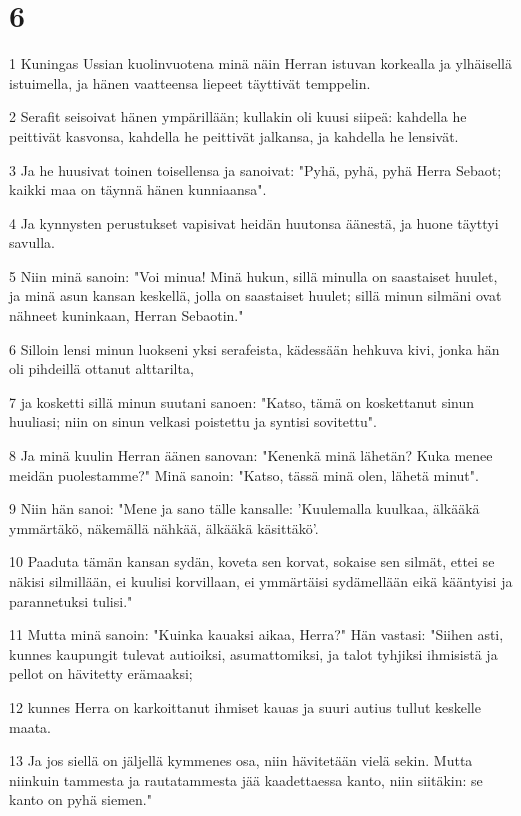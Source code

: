 \chapter{6}

\par 1 Kuningas Ussian kuolinvuotena minä näin Herran istuvan korkealla ja ylhäisellä istuimella, ja hänen vaatteensa liepeet täyttivät temppelin.
\par 2 Serafit seisoivat hänen ympärillään; kullakin oli kuusi siipeä: kahdella he peittivät kasvonsa, kahdella he peittivät jalkansa, ja kahdella he lensivät.
\par 3 Ja he huusivat toinen toisellensa ja sanoivat: "Pyhä, pyhä, pyhä Herra Sebaot; kaikki maa on täynnä hänen kunniaansa".
\par 4 Ja kynnysten perustukset vapisivat heidän huutonsa äänestä, ja huone täyttyi savulla.
\par 5 Niin minä sanoin: "Voi minua! Minä hukun, sillä minulla on saastaiset huulet, ja minä asun kansan keskellä, jolla on saastaiset huulet; sillä minun silmäni ovat nähneet kuninkaan, Herran Sebaotin."
\par 6 Silloin lensi minun luokseni yksi serafeista, kädessään hehkuva kivi, jonka hän oli pihdeillä ottanut alttarilta,
\par 7 ja kosketti sillä minun suutani sanoen: "Katso, tämä on koskettanut sinun huuliasi; niin on sinun velkasi poistettu ja syntisi sovitettu".
\par 8 Ja minä kuulin Herran äänen sanovan: "Kenenkä minä lähetän? Kuka menee meidän puolestamme?" Minä sanoin: "Katso, tässä minä olen, lähetä minut".
\par 9 Niin hän sanoi: "Mene ja sano tälle kansalle: 'Kuulemalla kuulkaa, älkääkä ymmärtäkö, näkemällä nähkää, älkääkä käsittäkö'.
\par 10 Paaduta tämän kansan sydän, koveta sen korvat, sokaise sen silmät, ettei se näkisi silmillään, ei kuulisi korvillaan, ei ymmärtäisi sydämellään eikä kääntyisi ja parannetuksi tulisi."
\par 11 Mutta minä sanoin: "Kuinka kauaksi aikaa, Herra?" Hän vastasi: "Siihen asti, kunnes kaupungit tulevat autioiksi, asumattomiksi, ja talot tyhjiksi ihmisistä ja pellot on hävitetty erämaaksi;
\par 12 kunnes Herra on karkoittanut ihmiset kauas ja suuri autius tullut keskelle maata.
\par 13 Ja jos siellä on jäljellä kymmenes osa, niin hävitetään vielä sekin. Mutta niinkuin tammesta ja rautatammesta jää kaadettaessa kanto, niin siitäkin: se kanto on pyhä siemen."

